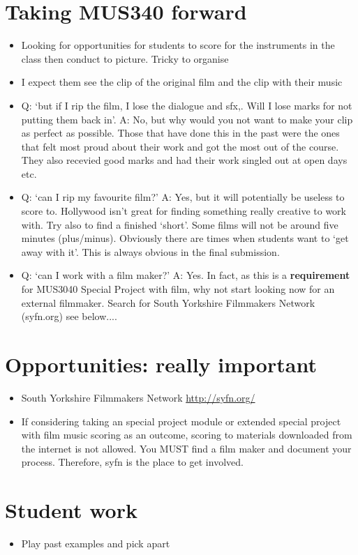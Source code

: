 \section{Taking MUS340 forward}
\begin{itemize}
\item Looking for opportunities for students to score for the instruments in the class then conduct to picture. Tricky to organise
\item I expect them see the clip of the original film and the clip with their music
\item Q: `but if I rip the film, I lose the dialogue and sfx,. Will I lose marks for not putting them back in'. A: No, but why would you not want to make your clip as perfect as possible. Those that have done this in the past were the ones that felt most proud about their work and got the most out of the course. They also recevied good marks and had their work singled out at open days etc.
\item Q: `can I rip my favourite film?' A: Yes, but it will potentially be useless to score to. Hollywood isn't great for finding something really creative to work with. Try also to find a finished `short'. Some films will not be around five minutes (plus/minus). Obviously there are times when students want to `get away with it'. This is always obvious in the final submission. 
\item Q: `can I work with a film maker?' A: Yes. In fact, as this is a \textbf{requirement} for MUS3040 Special Project with film, why not start looking now for an external filmmaker. Search for South Yorkshire Filmmakers Network (syfn.org) see below....
\end{itemize}

\section{Opportunities: really important}
\begin{itemize}
\item South Yorkshire Filmmakers Network \url{http://syfn.org/}
\item If considering taking an special project module or extended special project with film music scoring as an outcome, scoring to materials downloaded from the internet is not allowed. You MUST find a film maker and document your process. Therefore, syfn is the place to get involved. 
\end{itemize}

\section{Student work}
\begin{itemize}
\item Play past examples and pick apart
\end{itemize}



